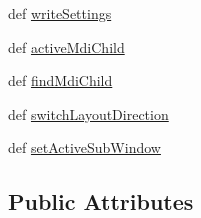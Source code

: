 \begin{DoxyCompactItemize}
\item 
def \hyperlink{classmdi_1_1MainWindow_a6cce2f8813dd83ef3cb87ca9d3f1fdda}{write\+Settings}
\item 
def \hyperlink{classmdi_1_1MainWindow_ab753eab52e7d80f0bb04caaa6a563cf6}{active\+Mdi\+Child}
\item 
def \hyperlink{classmdi_1_1MainWindow_abc89905b026d1cc9a74fabeb547103c2}{find\+Mdi\+Child}
\item 
def \hyperlink{classmdi_1_1MainWindow_a2f13e58246744c047a6f7e58a8b780c8}{switch\+Layout\+Direction}
\item 
def \hyperlink{classmdi_1_1MainWindow_acf5e42f15b6c3cf22bdf1b9fa00dae0f}{set\+Active\+Sub\+Window}
\end{DoxyCompactItemize}
\subsection*{Public Attributes}
